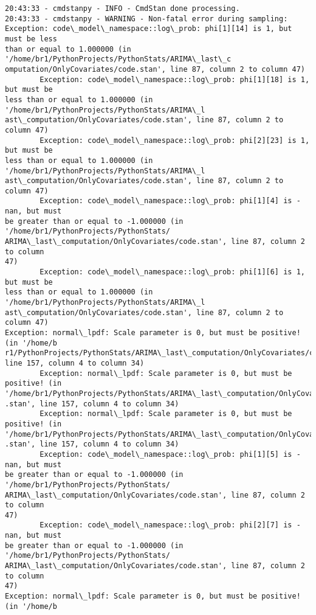 \documentclass[11pt]{article}
\begin{document}
    \begin{Verbatim}[commandchars=\\\{\}]
20:43:33 - cmdstanpy - INFO - CmdStan done processing.
20:43:33 - cmdstanpy - WARNING - Non-fatal error during sampling:
Exception: code\_model\_namespace::log\_prob: phi[1][14] is 1, but must be less
than or equal to 1.000000 (in '/home/br1/PythonProjects/PythonStats/ARIMA\_last\_c
omputation/OnlyCovariates/code.stan', line 87, column 2 to column 47)
        Exception: code\_model\_namespace::log\_prob: phi[1][18] is 1, but must be
less than or equal to 1.000000 (in '/home/br1/PythonProjects/PythonStats/ARIMA\_l
ast\_computation/OnlyCovariates/code.stan', line 87, column 2 to column 47)
        Exception: code\_model\_namespace::log\_prob: phi[2][23] is 1, but must be
less than or equal to 1.000000 (in '/home/br1/PythonProjects/PythonStats/ARIMA\_l
ast\_computation/OnlyCovariates/code.stan', line 87, column 2 to column 47)
        Exception: code\_model\_namespace::log\_prob: phi[1][4] is -nan, but must
be greater than or equal to -1.000000 (in '/home/br1/PythonProjects/PythonStats/
ARIMA\_last\_computation/OnlyCovariates/code.stan', line 87, column 2 to column
47)
        Exception: code\_model\_namespace::log\_prob: phi[1][6] is 1, but must be
less than or equal to 1.000000 (in '/home/br1/PythonProjects/PythonStats/ARIMA\_l
ast\_computation/OnlyCovariates/code.stan', line 87, column 2 to column 47)
Exception: normal\_lpdf: Scale parameter is 0, but must be positive! (in '/home/b
r1/PythonProjects/PythonStats/ARIMA\_last\_computation/OnlyCovariates/code.stan',
line 157, column 4 to column 34)
        Exception: normal\_lpdf: Scale parameter is 0, but must be positive! (in 
'/home/br1/PythonProjects/PythonStats/ARIMA\_last\_computation/OnlyCovariates/code
.stan', line 157, column 4 to column 34)
        Exception: normal\_lpdf: Scale parameter is 0, but must be positive! (in 
'/home/br1/PythonProjects/PythonStats/ARIMA\_last\_computation/OnlyCovariates/code
.stan', line 157, column 4 to column 34)
        Exception: code\_model\_namespace::log\_prob: phi[1][5] is -nan, but must
be greater than or equal to -1.000000 (in '/home/br1/PythonProjects/PythonStats/
ARIMA\_last\_computation/OnlyCovariates/code.stan', line 87, column 2 to column
47)
        Exception: code\_model\_namespace::log\_prob: phi[2][7] is -nan, but must
be greater than or equal to -1.000000 (in '/home/br1/PythonProjects/PythonStats/
ARIMA\_last\_computation/OnlyCovariates/code.stan', line 87, column 2 to column
47)
Exception: normal\_lpdf: Scale parameter is 0, but must be positive! (in '/home/b

\end{Verbatim}
\end{document}
